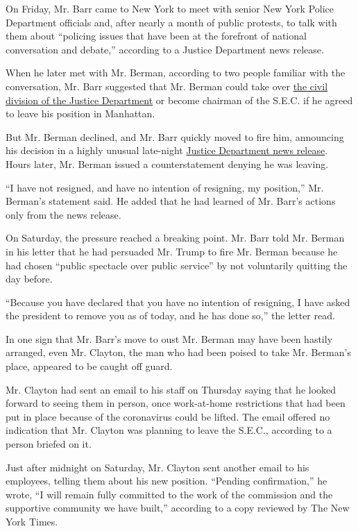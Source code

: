 On Friday, Mr. Barr came to New York to meet with senior New York Police
Department officials and, after nearly a month of public protests, to
talk with them about ``policing issues that have been at the forefront
of national conversation and debate,'' according to a Justice Department
news release.

When he later met with Mr. Berman, according to two people familiar with
the conversation, Mr. Barr suggested that Mr. Berman could take over
\href{https://www.nytimes.com/2020/06/16/us/politics/justice-department-jody-hunt.html}{the
civil division of the Justice Department} or become chairman of the
S.E.C. if he agreed to leave his position in Manhattan.

But Mr. Berman declined, and Mr. Barr quickly moved to fire him,
announcing his decision in a highly unusual late-night
\href{https://www.justice.gov/opa/pr/attorney-general-william-p-barr-nomination-jay-clayton-serve-us-attorney-southern-district}{Justice
Department news release}. Hours later, Mr. Berman issued a
counterstatement denying he was leaving.

``I have not resigned, and have no intention of resigning, my
position,'' Mr. Berman's statement said. He added that he had learned of
Mr. Barr's actions only from the news release.

On Saturday, the pressure reached a breaking point. Mr. Barr told Mr.
Berman in his letter that he had persuaded Mr. Trump to fire Mr. Berman
because he had chosen ``public spectacle over public service'' by not
voluntarily quitting the day before.

``Because you have declared that you have no intention of resigning, I
have asked the president to remove you as of today, and he has done
so,'' the letter read.

In one sign that Mr. Barr's move to oust Mr. Berman may have been
hastily arranged, even Mr. Clayton, the man who had been poised to take
Mr. Berman's place, appeared to be caught off guard.

Mr. Clayton had sent an email to his staff on Thursday saying that he
looked forward to seeing them in person, once work-at-home restrictions
that had been put in place because of the coronavirus could be lifted.
The email offered no indication that Mr. Clayton was planning to leave
the S.E.C., according to a person briefed on it.

Just after midnight on Saturday, Mr. Clayton sent another email to his
employees, telling them about his new position. ``Pending
confirmation,'' he wrote, ``I will remain fully committed to the work of
the commission and the supportive community we have built,'' according
to a copy reviewed by The New York Times.

